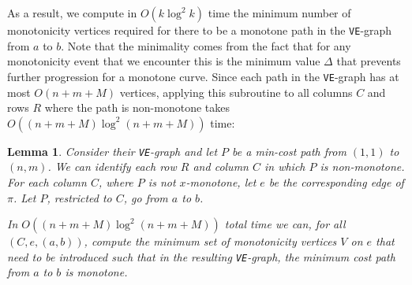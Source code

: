 \documentclass[10pt,a4paper]{article}
\newtheorem{lemma}[theorem]{Lemma}
\begin{document}
As a result, we compute in $O(k \log^2 k)$ time the minimum number of monotonicity vertices required for there to be a monotone path in the \texttt{VE}-graph from $a$ to $b$. Note that the minimality comes from the fact that for any monotonicity event that we encounter this is the minimum value $\Delta$ that prevents further progression for a monotone curve. 
Since each path in the \texttt{VE}-graph has at most $O(n + m + M)$ vertices, applying this subroutine to all columns $C$ and rows $R$ where the path is non-monotone takes $O( (n + m + M) \log^2 (n + m + M))$ time:

\begin{lemma}
    Consider their \texttt{VE}-graph and let $P$ be a min-cost path from $(1, 1)$ to $(n, m)$. 
We can identify each row $R$ and column $C$ in which $P$ is non-monotone.
For each column $C$, where $P$ is not $x$-monotone, let $e$ be the corresponding edge of $\pi$. Let $P$, restricted to $C$, go from $a$ to $b$.

In $O( (n + m + M) \log^2 (n + m + M))$ total time we can, for all $(C, e, (a, b))$,  compute the minimum set of monotonicity vertices $V$ on $e$ that need to be introduced such that in the resulting \texttt{VE}-graph, the minimum cost path from $a$ to $b$ is monotone. 
\end{lemma}
\end{document}
